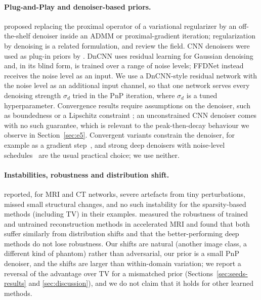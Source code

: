 \paragraph{Plug-and-Play and denoiser-based priors.}
\citet{venkatakrishnan2013plugandplay} proposed replacing the proximal operator of a variational regularizer by
an off-the-shelf denoiser inside an ADMM or proximal-gradient iteration; regularization by denoising
\citep{romano2017} is a related formulation, and \citet{kamilov2023} review the field. CNN denoisers were used
as plug-in priors by \citet{zhang2017ircnn}. DnCNN \citep{zhang2017dncnn} uses residual learning for Gaussian
denoising and, in its blind form, is trained over a range of noise levels; FFDNet \citep{zhang2018ffdnet}
instead receives the noise level as an input. We use a DnCNN-style residual network with the noise level as an
additional input channel, so that one network serves every denoising strength $\sigma_d$ tried in the PnP
iteration, where $\sigma_d$ is a tuned hyperparameter. Convergence results require assumptions on the denoiser,
such as boundedness or a Lipschitz constraint \citep{chan2016pnp,ryu2019pnp}; an unconstrained CNN denoiser
comes with no such guarantee, which is relevant to the peak-then-decay behaviour we observe in
Section~\ref{sec:e5}. Convergent variants constrain the denoiser, for example as a gradient step~\citep{hurault2022gradient}, and strong deep denoisers with noise-level schedules~\citep{zhang2022dpir} are the usual practical choice; we use neither.

\paragraph{Instabilities, robustness and distribution shift.} \citet{antun2020instabilities} reported, for
MRI and CT networks, severe artefacts from tiny perturbations, missed small structural changes, and no such
instability for the sparsity-based methods (including TV) in their examples.
\citet{darestani2021shift} measured the robustness of trained and untrained reconstruction methods in
accelerated MRI and found that both suffer similarly from distribution shifts and that the better-performing
deep methods do not lose robustness. Our shifts are natural (another image class, a different kind of
phantom) rather than adversarial, our prior is a small PnP denoiser, and the shifts are larger than
within-domain variation; we report a reversal of the advantage over TV for a mismatched prior
(Sections~\ref{sec:seeds-results} and \ref{sec:discussion}), and we do not claim that it holds for other
learned methods.

